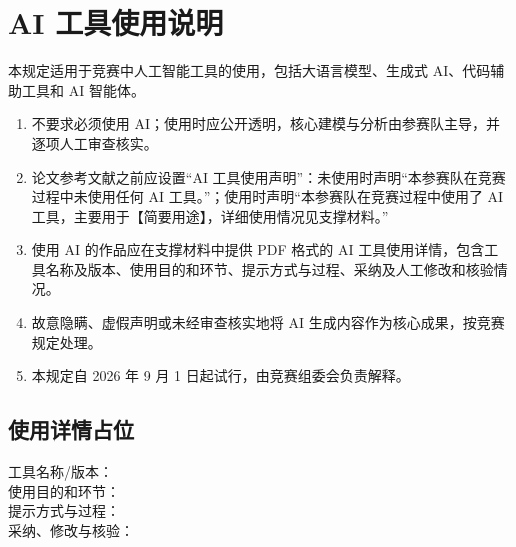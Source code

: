 \section*{AI 工具使用说明}
本规定适用于竞赛中人工智能工具的使用，包括大语言模型、生成式 AI、代码辅助工具和 AI 智能体。

\begin{enumerate}
\item 不要求必须使用 AI；使用时应公开透明，核心建模与分析由参赛队主导，并逐项人工审查核实。
\item 论文参考文献之前应设置“AI 工具使用声明”：未使用时声明“本参赛队在竞赛过程中未使用任何 AI 工具。”；使用时声明“本参赛队在竞赛过程中使用了 AI 工具，主要用于【简要用途】，详细使用情况见支撑材料。”
\item 使用 AI 的作品应在支撑材料中提供 PDF 格式的 AI 工具使用详情，包含工具名称及版本、使用目的和环节、提示方式与过程、采纳及人工修改和核验情况。
\item 故意隐瞒、虚假声明或未经审查核实地将 AI 生成内容作为核心成果，按竞赛规定处理。
\item 本规定自 2026 年 9 月 1 日起试行，由竞赛组委会负责解释。
\end{enumerate}

\subsection*{使用详情占位}
工具名称/版本：\underline{\hspace{0.5\textwidth}}\\
使用目的和环节：\underline{\hspace{0.5\textwidth}}\\
提示方式与过程：\underline{\hspace{0.5\textwidth}}\\
采纳、修改与核验：\underline{\hspace{0.5\textwidth}}
